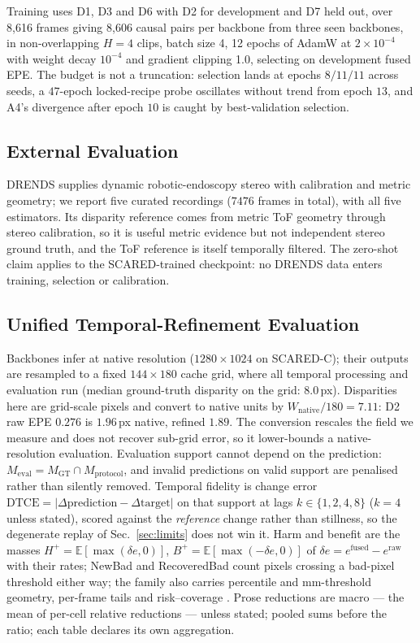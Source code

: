 \documentclass[letterpaper,10pt,conference]{ieeeconf}
\newcommand{\raw}{\mathrm{raw}}
\newcommand{\fused}{\mathrm{fused}}
\newcommand{\HPlus}{H^{+}}
\newcommand{\BPlus}{B^{+}}
\newcommand{\DTCE}{\mathrm{DTCE}}
\begin{document}
Training uses D1, D3 and D6 with D2 for development and D7 held out, over
8{,}616 frames giving 8{,}606 causal pairs per backbone from three seen
backbones, in non-overlapping $H=4$ clips, batch size 4, 12 epochs of AdamW at
$2\times10^{-4}$ with weight decay $10^{-4}$ and gradient clipping 1.0,
selecting on development fused EPE. The budget is not a truncation: selection lands at epochs $8/11/11$ across seeds, a $47$-epoch locked-recipe probe oscillates without trend from epoch $13$, and A4's divergence after epoch $10$ is caught by best-validation selection.

\subsection{External Evaluation}

DRENDS \cite{loza2025drends} supplies dynamic robotic-endoscopy stereo with
calibration and metric geometry; we report five curated recordings ($7476$
frames in total), with all five estimators. Its disparity reference comes from
metric ToF geometry through stereo calibration, so it is useful metric
evidence but not independent stereo ground truth, and the ToF reference is
itself temporally filtered. The zero-shot claim applies to the SCARED-trained
checkpoint: no DRENDS data enters training, selection or calibration.

\subsection{Unified Temporal-Refinement Evaluation}

Backbones infer at native resolution ($1280\times1024$ on SCARED-C); their
outputs are resampled to a fixed $144\times180$ cache grid, where all
temporal processing and evaluation run (median ground-truth disparity on the
grid: $8.0$\,px). Disparities here are grid-scale pixels and convert to
native units by $W_{\mathrm{native}}/180=7.11$: D2 raw EPE $0.276$ is
$1.96$\,px native, refined $1.89$. The conversion rescales the field we
measure and does not recover sub-grid error, so it lower-bounds a
native-resolution evaluation. Evaluation support cannot depend on the prediction:
$M_{\mathrm{eval}} = M_{\mathrm{GT}} \cap M_{\mathrm{protocol}}$, and invalid
predictions on valid support are penalised rather than silently removed.
Temporal fidelity is change error
$\DTCE=|\Delta\text{prediction}-\Delta\text{target}|$ on that support at lags
$k\in\{1,2,4,8\}$ ($k{=}4$ unless stated), scored against the \emph{reference}
change rather than stillness, so the degenerate replay of
Sec.~\ref{sec:limits} does not win it. Harm and benefit are the masses
$\HPlus=\mathbb{E}[\max(\delta e,0)]$, $\BPlus=\mathbb{E}[\max(-\delta
e,0)]$ of $\delta e=e^{\fused}-e^{\raw}$ with their rates; NewBad and
RecoveredBad count pixels crossing a bad-pixel threshold either way; the
family also carries percentile and mm-threshold geometry, per-frame tails and
risk--coverage \cite{geifman2019selectivenet}. Prose reductions are macro ---
the mean of per-cell relative reductions --- unless stated; pooled sums
before the ratio; each table declares its own aggregation.
\end{document}
